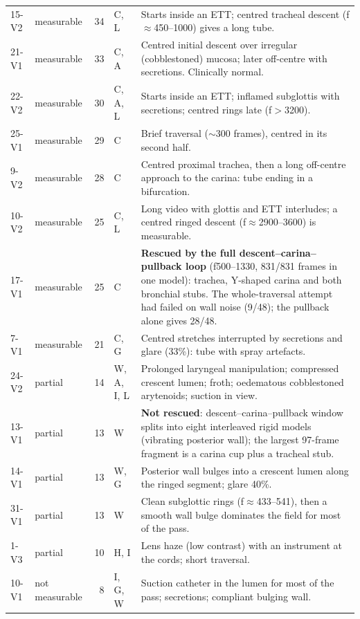 \begin{tabular}{llrlp{8.6cm}}
15-V2 & measurable & 34 & C, L & Starts inside an ETT; centred tracheal descent (f$\approx$450--1000) gives a long tube. \\
21-V1 & measurable & 33 & C, A & Centred initial descent over irregular (cobblestoned) mucosa; later off-centre with secretions. Clinically normal. \\
22-V2 & measurable & 30 & C, A, L & Starts inside an ETT; inflamed subglottis with secretions; centred rings late (f$>$3200). \\
25-V1 & measurable & 29 & C & Brief traversal ($\sim$300 frames), centred in its second half. \\
9-V2  & measurable & 28 & C & Centred proximal trachea, then a long off-centre approach to the carina: tube ending in a bifurcation. \\
10-V2 & measurable & 25 & C, L & Long video with glottis and ETT interludes; a centred ringed descent (f$\approx$2900--3600) is measurable. \\
17-V1 & measurable & 25 & C & \textbf{Rescued by the full descent--carina--pullback loop} (f500--1330, 831/831 frames in one model): trachea, Y-shaped carina and both bronchial stubs. The whole-traversal attempt had failed on wall noise (9/48); the pullback alone gives 28/48. \\
7-V1  & measurable & 21 & C, G & Centred stretches interrupted by secretions and glare (33\%): tube with spray artefacts. \\
\midrule
24-V2 & partial & 14 & W, A, I, L & Prolonged laryngeal manipulation; compressed crescent lumen; froth; oedematous cobblestoned arytenoids; suction in view. \\
13-V1 & partial & 13 & W & \textbf{Not rescued}: descent--carina--pullback window splits into eight interleaved rigid models (vibrating posterior wall); the largest 97-frame fragment is a carina cup plus a tracheal stub. \\
14-V1 & partial & 13 & W, G & Posterior wall bulges into a crescent lumen along the ringed segment; glare 40\%. \\
31-V1 & partial & 13 & W & Clean subglottic rings (f$\approx$433--541), then a smooth wall bulge dominates the field for most of the pass. \\
1-V3  & partial & 10 & H, I & Lens haze (low contrast) with an instrument at the cords; short traversal. \\
\midrule
10-V1 & not measurable & 8 & I, G, W & Suction catheter in the lumen for most of the pass; secretions; compliant bulging wall. \\

\end{tabular}
